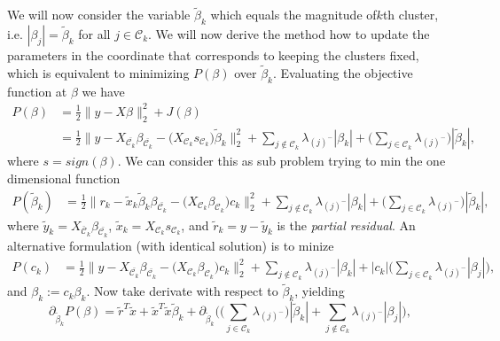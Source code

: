 We will now consider the variable $\tilde \beta_k$ which equals the magnitude of\(k\)th cluster, i.e. $|\beta_j|=\tilde \beta_k$ for all $j \in \mathcal{C}_k$.
We will now derive the method how to update the parameters in the coordinate that corresponds to keeping the clusters fixed, which is equivalent to minimizing $P(\beta)$ over $\tilde \beta_k$.
Evaluating the objective function at $\beta$ we have
\[
  \begin{aligned}
    P(\beta) & =  \frac{1}{2} \lVert y - X\beta\rVert_2^2 + J(\beta)                                                                                                                                                                                                                                   \\
             & = \frac{1}{2} \lVert y - X_{\bar{\mathcal{C}_k}} \beta_{\bar{\mathcal{C}_k}} - \big(X_{\mathcal{C}_k} s_{\mathcal{C}_k}\big)\tilde\beta_k  \rVert_2^2 + \sum_{j \notin {\mathcal{C}_k}} \lambda_{(j)^-}|\beta_k| + \bigg(\sum_{j \in {\mathcal{C}_k}} \lambda_{(j)^-}\bigg)|\tilde\beta_k|,
  \end{aligned}
\]
where $s=sign(\beta)$. We can consider this as sub problem trying to min the one dimensional function\[
  \begin{aligned}
    P(\tilde \beta_k)   & = \frac{1}{2} \lVert r_k - \tilde x_k \tilde \beta_k \beta_{\bar{\mathcal{C}_k}} - \big(X_{\mathcal{C}_k} \beta_{\mathcal{C}_k}\big)c_k  \rVert_2^2 + \sum_{j \notin {\mathcal{C}_k}} \lambda_{(j)^-}|\beta_k| + \bigg(\sum_{j \in {\mathcal{C}_k}} \lambda_{(j)^- }\bigg) |\tilde \beta_k|,
  \end{aligned}
\]
where \(\tilde y_k = X_{\bar{\mathcal{C}}_k} \beta_{\bar{\mathcal{C}_k}}\), $ \tilde x_k = X_{\mathcal{C}_k} s_{\mathcal{C}_k}$,
and \(\tilde r_k= y - \tilde y_k\) is the \emph{partial residual}. An alternative formulation (with identical solution) is to minize
\[
  \begin{aligned}
    P(c_k)   & = \frac{1}{2} \lVert y - X_{\bar{\mathcal{C}_k}} \beta_{\bar{\mathcal{C}_k}} - \big(X_{\mathcal{C}_k} \beta_{\mathcal{C}_k}\big)c_k  \rVert_2^2 + \sum_{j \notin {\mathcal{C}_k}} \lambda_{(j)^-}|\beta_k| + |c_k|\bigg(\sum_{j \in {\mathcal{C}_k}} \lambda_{(j)^- }|\beta_j|\bigg),
  \end{aligned}
\]
and $\beta_k := c_k\beta_k$.
Now take
derivate with respect to \(\tilde\beta_k\), yielding
\begin{equation}
  \label{eq:cluster-grad}
  \partial_{\tilde\beta_k}
  P(\beta) = \tilde r^T \tilde x + \tilde x^T \tilde x \tilde\beta_k + \partial_{\tilde\beta_k}\Bigg(\bigg(\sum_{j \in {\mathcal{C}_k}} \lambda_{(j)^-}\bigg)|\tilde\beta_k| + \sum_{j \notin \mathcal{C}_k}\lambda_{(j)^-}|\beta_j|\Bigg),
\end{equation}
